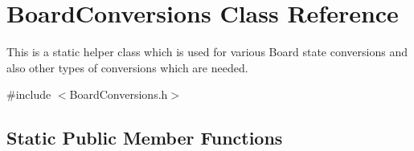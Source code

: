 \hypertarget{classBoardConversions}{}\section{Board\+Conversions Class Reference}
\label{classBoardConversions}


This is a static helper class which is used for various Board state conversions and also other types of conversions which are needed.  




{\ttfamily \#include $<$Board\+Conversions.\+h$>$}

\subsection*{Static Public Member Functions}
